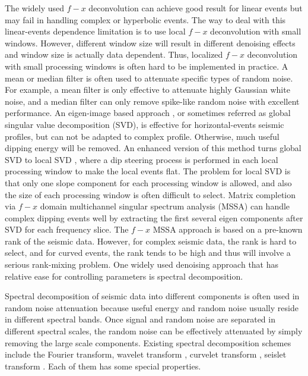 The widely used $f-x$ deconvolution \cite[]{canales} can achieve good result for linear events but may fail in handling complex or hyperbolic events. The way to deal with this linear-events dependence limitation is to use local $f-x$ deconvolution with small windows. However, different window size will result in different denoising effects and  window size is actually data dependent. Thus, localized $f-x$ deconvolution with small processing windows is often hard to be implemented in practice.  A mean or median filter \cite[]{nlm,liuyang2009tvmf,yangkang2014svmf} is often used to attenuate specific types of random noise. For example, a mean filter is only effective to attenuate highly Gaussian white noise, and a median filter \cite[]{yangkang2014svmf,yangkang2014nmo} can only remove spike-like random noise with excellent performance. An eigen-image based approach \cite[]{bekara2007}, or sometimes referred as global singular value decomposition (SVD), is effective for horizontal-events seismic profiles, but can not be adapted to complex profile. Otherwise, much useful dipping energy will be removed. An enhanced version of this method turns global SVD to local SVD \cite[]{bekara2007}, where a dip steering process is performed in each local processing window to make the local events flat. The problem for local SVD is that only one slope component for each processing window is allowed, and also the size of each processing window is often difficult to select. Matrix completion via $f-x$ domain multichannel singular spectrum analysis (MSSA) can handle complex dipping events well by extracting the first several eigen components after SVD for each frequency slice. The $f-x$ MSSA approach is based on a pre-known rank of the seismic data. However, for complex seismic data, the rank is hard to select, and for curved events, the rank tends to be high and thus will involve a serious rank-mixing problem. One widely used denoising approach that has relative ease for controlling parameters is spectral decomposition. 

Spectral decomposition of seismic data into different components is often used in random noise attenuation because useful energy and random noise usually reside in different spectral bands. Once signal and random noise are separated in different spectral scales, the random noise can be effectively attenuated by simply removing the large scale components. Existing spectral decomposition schemes include the Fourier transform, wavelet transform \cite[]{mallat,wavelet}, curvelet transform \cite[]{curvelet}, seislet transform \cite[]{seislet,yangkang20142}. Each of them has some special properties. 

